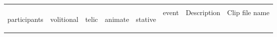 \noindent
\footnotesize
\begin{tabularx}{\textwidth}{llllllQl}
\lsptoprule 
\\[.4cm] %
\begin{rotate}{30}participants\end{rotate} 		& \begin{rotate}{30}volitional\end{rotate} 		& \begin{rotate}{30}telic\end{rotate} 		& \begin{rotate}{30}animate\end{rotate} 		& \begin{rotate}{30}stative\end{rotate} 		&  event 	&Description 									&Clip file name \\


\end{tabularx}
